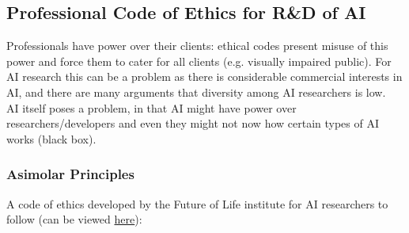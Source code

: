 \subsection{Professional Code of Ethics for R\&D of AI}
Professionals have power over their clients: ethical codes present misuse of this power and force them to cater for all clients (e.g. visually impaired public). For AI research this can be a problem as there is considerable commercial interests in AI, and there are many arguments that diversity among AI researchers is low. \\
AI itself poses a problem, in that AI might have power over researchers/developers and even they might not now how certain types of AI works (black box).

\subsubsection{Asimolar Principles}
A code of ethics developed by the Future of Life institute for AI researchers to follow  (can be viewed \href{https://futureoflife.org/ai-principles/}{here}):
